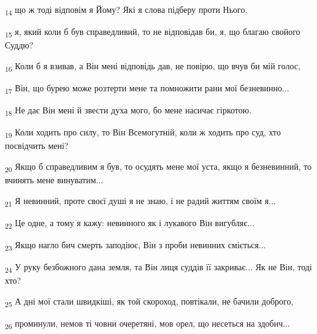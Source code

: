 \begin{tcolorbox}
\textsubscript{14} що ж тоді відповім я Йому? Які я слова підберу проти Нього,
\end{tcolorbox}
\begin{tcolorbox}
\textsubscript{15} я, який коли б був справедливий, то не відповідав би, я, що благаю свойого Суддю?
\end{tcolorbox}
\begin{tcolorbox}
\textsubscript{16} Коли б я взивав, а Він мені відповідь дав, не повірю, що вчув би мій голос,
\end{tcolorbox}
\begin{tcolorbox}
\textsubscript{17} Він, що бурею може розтерти мене та помножити рани мої безневинно...
\end{tcolorbox}
\begin{tcolorbox}
\textsubscript{18} Не дає Він мені й звести духа мого, бо мене насичає гіркотою.
\end{tcolorbox}
\begin{tcolorbox}
\textsubscript{19} Коли ходить про силу, то Він Всемогутній, коли ж ходить про суд, хто посвідчить мені?
\end{tcolorbox}
\begin{tcolorbox}
\textsubscript{20} Якщо б справедливим я був, то осудять мене мої уста, якщо я безневинний, то вчинять мене винуватим...
\end{tcolorbox}
\begin{tcolorbox}
\textsubscript{21} Я невинний, проте своєї душі я не знаю, і не радий життям своїм я...
\end{tcolorbox}
\begin{tcolorbox}
\textsubscript{22} Це одне, а тому я кажу: невинного як і лукавого Він вигубляє...
\end{tcolorbox}
\begin{tcolorbox}
\textsubscript{23} Якщо нагло бич смерть заподіює, Він з проби невинних сміється...
\end{tcolorbox}
\begin{tcolorbox}
\textsubscript{24} У руку безбожного дана земля, та Він лиця суддів її закриває... Як не Він, тоді хто?
\end{tcolorbox}
\begin{tcolorbox}
\textsubscript{25} А дні мої стали швидкіші, як той скороход, повтікали, не бачили доброго,
\end{tcolorbox}
\begin{tcolorbox}
\textsubscript{26} проминули, немов ті човни очеретяні, мов орел, що несеться на здобич...
\end{tcolorbox}
